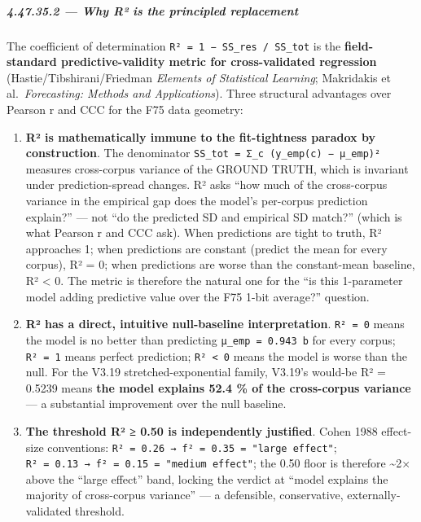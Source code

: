 \documentclass[
]{article}
\begin{document}
\subparagraph{4.47.35.2 --- Why R² is the principled
replacement}\label{why-ruxb2-is-the-principled-replacement}

The coefficient of determination
\texttt{R²\ =\ 1\ −\ SS\_res\ /\ SS\_tot} is the \textbf{field-standard
predictive-validity metric for cross-validated regression}
(Hastie/Tibshirani/Friedman \emph{Elements of Statistical Learning};
Makridakis et al.~\emph{Forecasting: Methods and Applications}). Three
structural advantages over Pearson r and CCC for the F75 data geometry:

\begin{enumerate}
\def\labelenumi{\arabic{enumi}.}
\item
  \textbf{R² is mathematically immune to the fit-tightness paradox by
  construction}. The denominator
  \texttt{SS\_tot\ =\ Σ\_c\ (y\_emp(c)\ −\ μ\_emp)²} measures
  cross-corpus variance of the GROUND TRUTH, which is invariant under
  prediction-spread changes. R² asks ``how much of the cross-corpus
  variance in the empirical gap does the model's per-corpus prediction
  explain?'' --- not ``do the predicted SD and empirical SD match?''
  (which is what Pearson r and CCC ask). When predictions are tight to
  truth, R² approaches 1; when predictions are constant (predict the
  mean for every corpus), R² = 0; when predictions are worse than the
  constant-mean baseline, R² \textless{} 0. The metric is therefore the
  natural one for the ``is this 1-parameter model adding predictive
  value over the F75 1-bit average?'' question.
\item
  \textbf{R² has a direct, intuitive null-baseline interpretation}.
  \texttt{R²\ =\ 0} means the model is no better than predicting
  \texttt{μ\_emp\ =\ 0.943\ b} for every corpus; \texttt{R²\ =\ 1} means
  perfect prediction; \texttt{R²\ \textless{}\ 0} means the model is
  worse than the null. For the V3.19 stretched-exponential family,
  V3.19's would-be R² = 0.5239 means \textbf{the model explains 52.4 \%
  of the cross-corpus variance} --- a substantial improvement over the
  null baseline.
\item
  \textbf{The threshold R² ≥ 0.50 is independently justified}. Cohen
  1988 effect-size conventions:
  \texttt{R²\ =\ 0.26\ →\ f²\ =\ 0.35\ =\ "large\ effect"};
  \texttt{R²\ =\ 0.13\ →\ f²\ =\ 0.15\ =\ "medium\ effect"}; the 0.50
  floor is therefore \textasciitilde2× above the ``large effect'' band,
  locking the verdict at ``model explains the majority of cross-corpus
  variance'' --- a defensible, conservative, externally-validated
  threshold.
\end{enumerate}
\end{document}

